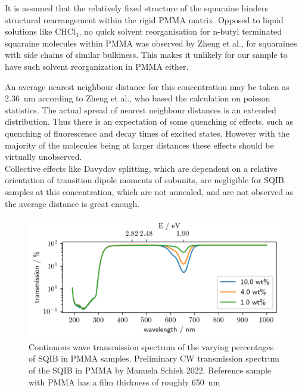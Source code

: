 \documentclass[twoside,openright,listof=numbered]{scrreprt}
\begin{document}
It is assumed that the relatively fixed structure of the squaraine hinders structural rearrangement within the rigid PMMA matrix.
Opposed to liquid solutions like $\mathrm{CHCl_3}$, no quick solvent reorganisation for n-butyl terminated squaraine molecules within PMMA was observed by Zheng et al.\cite{Zheng2020}, for squaraines with side chains of similar bulkiness. This makes it unlikely for our sample to have such solvent reorganization in PMMA either.

An average nearest neighbour distance for this concentration may be taken as \SI{2.36}{\nano\meter} according to Zheng et al.\cite{Zheng2020}, who based the calculation on poisson statistics\cite{Krider2003}. The actual spread of nearest neighbour distances is an extended distribution. Thus there is an expectation of some quenching of effects, such as quenching of fluorescence and decay times of excited states. However with the majority of the molecules being at larger distances these effects should be virtually unobserved.\cite{Zheng2020} \\
Collective effects like Davydov splitting, which are dependent on a relative orientation of transition dipole moments of subunits, are negligible for SQIB samples at this concentration, which are not annealed, and are not observed as the average distance is great enough.\\

\begin{figure}[!htp]
\centering
\includegraphics[scale = 1]{images/SQIB_VarPercentInPMMA_transmission.png}
\caption[Continuous wave transmission spectrum of the varying percentages of SQIB in PMMA samples.]{Continuous wave transmission spectrum of the varying percentages of SQIB in PMMA samples.\label{fig:VarpercentCWspectrum} Preliminary CW transmission spectrum of the SQIB in PMMA by Manuela Schiek 2022.\cite{Schiek2022} Reference sample with PMMA has a film thickness of roughly \SI{650}{\nano\meter}}
\end{figure}
\end{document}

